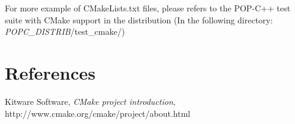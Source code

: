 \documentclass[a4paper, 11pt]{article}
\begin{document}
For more example of CMakeLists.txt files, please refers to the POP-C++ test suite with CMake support in the distribution (In the following directory: \textit{POPC\_DISTRIB}/test\_cmake/)



%
% 
%

\section{References}
\begin{thebibliography}{9}
	Kitware Software,
  	\emph{CMake project introduction}, http://www.cmake.org/cmake/project/about.html
	


\end{thebibliography}



\pagebreak
\appendix
%
\end{document}

